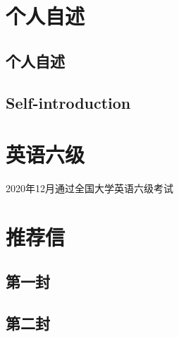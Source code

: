 \documentclass[UFT8]{ctexart}
\begin{document}
\clearpage
\section{个人自述}
\subsection{个人自述}
\subsection{Self-introduction}


%
%



\clearpage
\section{英语六级}
2020年12月通过全国大学英语六级考试


\clearpage
\section{推荐信}
\subsection{第一封}
\clearpage
\subsection{第二封}
\end{document}
